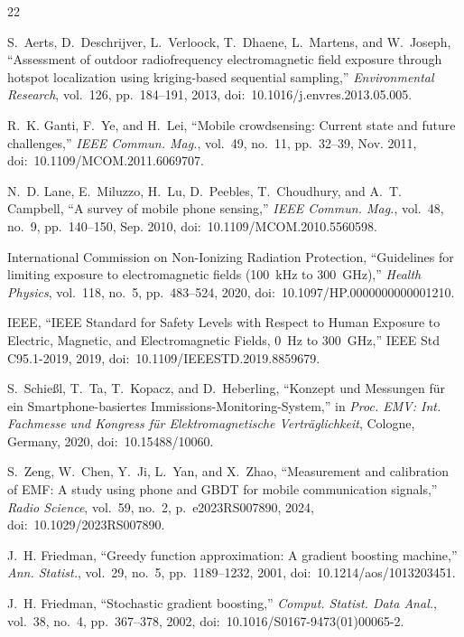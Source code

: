 \documentclass{ieeeaccess}
\begin{document}
\begin{thebibliography}{22}

S.~Aerts, D.~Deschrijver, L.~Verloock, T.~Dhaene, L.~Martens, and W.~Joseph,
``Assessment of outdoor radiofrequency electromagnetic field exposure through
hotspot localization using kriging-based sequential sampling,''
\emph{Environmental Research}, vol.~126, pp.~184--191, 2013,
doi:~10.1016/j.envres.2013.05.005.

R.~K. Ganti, F.~Ye, and H.~Lei, ``Mobile crowdsensing: Current state and
future challenges,'' \emph{IEEE Commun. Mag.}, vol.~49, no.~11,
pp.~32--39, Nov. 2011, doi:~10.1109/MCOM.2011.6069707.

N.~D. Lane, E.~Miluzzo, H.~Lu, D.~Peebles, T.~Choudhury, and A.~T. Campbell,
``A survey of mobile phone sensing,'' \emph{IEEE Commun. Mag.}, vol.~48,
no.~9, pp.~140--150, Sep. 2010, doi:~10.1109/MCOM.2010.5560598.

International Commission on Non-Ionizing Radiation Protection, ``Guidelines for
limiting exposure to electromagnetic fields (100~kHz to 300~GHz),''
\emph{Health Physics}, vol.~118, no.~5, pp.~483--524, 2020,
doi:~10.1097/HP.0000000000001210.

IEEE, ``IEEE Standard for Safety Levels with Respect to Human Exposure to
Electric, Magnetic, and Electromagnetic Fields, 0~Hz to 300~GHz,''
IEEE Std C95.1-2019, 2019, doi:~10.1109/IEEESTD.2019.8859679.

S.~Schie{\ss}l, T.~Ta, T.~Kopacz, and D.~Heberling, ``Konzept und Messungen
f\"ur ein Smartphone-basiertes Immissions-Monitoring-System,'' in \emph{Proc.
EMV: Int. Fachmesse und Kongress f\"ur Elektromagnetische
Vertr\"aglichkeit}, Cologne, Germany, 2020, doi:~10.15488/10060.

S.~Zeng, W.~Chen, Y.~Ji, L.~Yan, and X.~Zhao, ``Measurement and calibration of
EMF: A study using phone and GBDT for mobile communication signals,''
\emph{Radio Science}, vol.~59, no.~2, p.~e2023RS007890, 2024,
doi:~10.1029/2023RS007890.

J.~H. Friedman, ``Greedy function approximation: A gradient boosting machine,''
\emph{Ann. Statist.}, vol.~29, no.~5, pp.~1189--1232, 2001,
doi:~10.1214/aos/1013203451.

J.~H. Friedman, ``Stochastic gradient boosting,'' \emph{Comput. Statist.
Data Anal.}, vol.~38, no.~4, pp.~367--378, 2002,
doi:~10.1016/S0167-9473(01)00065-2.


\end{thebibliography}
\end{document}
